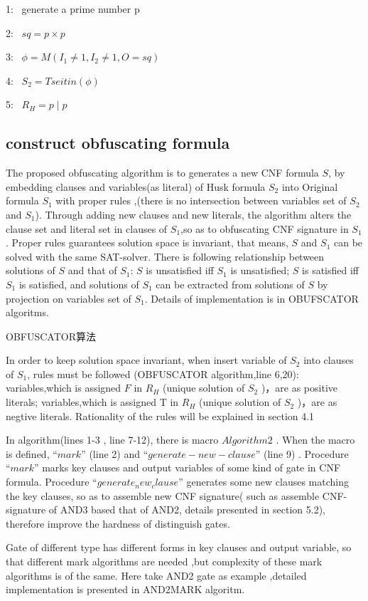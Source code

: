 \documentclass[runningheads,a4paper]{llncs}
\begin{document}
1:~ generate a prime number p

2:~ $sq=p\times p$

3:~ $\phi= M(I_1 \neq 1, I_2\neq 1, O=sq)$

4:~ $S_2=Tseitin(\phi)$

5:~ $R_H=p\mid p$

\subsection{construct obfuscating formula}

The proposed obfuscating algorithm is to generates a new CNF formula $S$, 
by embedding clauses and variables(as literal) of Husk formula $S_2$ into Original formula $S_1$ with proper rules ,(there is no intersection between variables set of $S_2$ and $S_1$). 
Through adding new clauses and new literals, the algorithm alters the clause set and literal set in clauses of $S_1$,so as to obfuscating CNF signature in $S_1$.
Proper rules guarantees solution space is invariant, that means, $S$ and $S_1$ can be solved with the same SAT-solver.
There is following relationship between solutions of $S$ and that of $S_1$: $S$ is unsatisfied iff $S_1$ is unsatisfied;
$S$ is satisfied iff $S_1$ is satisfied, and solutions of $S_1$ can be extracted from solutions of $S$ by projection on variables set of $S_1$.
Details of implementation is in OBUFSCATOR algoritms.

OBFUSCATOR算法

In order to keep solution space invariant, when insert variable of $S_2$ into clauses of $S_1$, rules must be followed (OBFUSCATOR algorithm,line 6,20):
variables,which is assigned $F$ in $R_H$ (unique solution of $S_2$ )，are as positive literals;
variables,which is assigned T in $R_H$ (unique solution of $S_2$ )，are as negtive literals. 
Rationality of the rules will be explained in section 4.1

In algorithm(lines 1-3 , line 7-12), there is macro $Algorithm2$ . When the macro is defined, $“mark”$ (line 2) and $“generate-new-clause”$ (line 9) . 
Procedure $“mark”$ marks key clauses and output variables of some kind of gate in CNF formula.
Procedure $“generate_new_clause”$ generates some new clauses matching the key clauses, so as to  assemble new CNF signature( such as assemble CNF-signature of AND3 based that of AND2, 
details presented in section 5.2), therefore improve the hardness of distinguish gates.

Gate of different type has different forms in key clauses and output variable, so that different mark algorithms are needed ,but complexity of these mark algorithms is of the same. 
Here take AND2 gate as example ,detailed implementation is presented in AND2MARK algoritm.  
\end{document}
